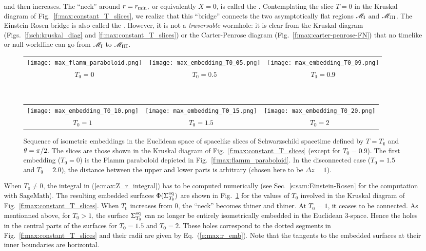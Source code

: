 and then increases. The ``neck'' around $r=r_{\rm min}$, or equivalently $X=0$, is called the
 \cite{EinstR35}.
Contemplating the slice $T=0$ in the
Kruskal diagram of Fig.~\ref{f:max:constant_T_slices}, we realize that
this ``bridge'' connects the two asymptotically flat regions $\mathscr{M}_{\rm I}$ and
$\mathscr{M}_{\rm III}$. The Einstein-Rosen bridge is also called
the . However, it is not
a \emph{traversable} wormhole: it is clear from the Kruskal diagram
(Figs.~\ref{f:sch:kruskal_diag} and \ref{f:max:constant_T_slices})
or the Carter-Penrose diagram (Fig.~\ref{f:max:carter-penrose-FN}) that no
timelike or null worldline can go from $\mathscr{M}_{\rm I}$ to
$\mathscr{M}_{\rm III}$.

\begin{figure}
\begin{center}
\begin{tabular}{ccc}
\texttt{[image: max\_flamm\_paraboloid.png]} &
\texttt{[image: max\_embedding\_T0\_05.png]} &
\texttt{[image: max\_embedding\_T0\_09.png]} \\
$T_0=0$ & $T_0=0.5$ & $T_0=0.9$
\end{tabular} \\
\begin{tabular}{ccc}
\texttt{[image: max\_embedding\_T0\_10.png]} &
\texttt{[image: max\_embedding\_T0\_15.png]} &
\texttt{[image: max\_embedding\_T0\_20.png]} \\
$T_0=1$ & $T_0=1.5$ & $T_0=2$
\end{tabular}
\end{center}
\caption[]{\label{f:max:embeddings} \footnotesize
Sequence of isometric embeddings in the Euclidean space
of spacelike slices of Schwarzschild spacetime defined by
$T=T_0$ and $\theta=\pi/2$. The slices are those shown in the Kruskal diagram
of Fig.~\ref{f:max:constant_T_slices} (except for $T_0=0.9$).
The first embedding ($T_0=0$) is the
Flamm paraboloid depicted in Fig.~\ref{f:max:flamm_paraboloid}.
In the disconnected case ($T_0=1.5$ and $T_0=2.0$),
the distance
between the upper and lower parts is arbitrary (chosen here to be $\Delta z = 1$).}
\end{figure}

When $T_0\not=0$, the integral in (\ref{e:max:Z_r_integral}) has to
be computed numerically (see Sec.~\ref{s:sam:Einstein-Rosen} for the computation with SageMath).
The resulting embedded surfaces $\Phi(\Sigma_{T_0}^{\rm eq})$ are shown in
Fig.~\ref{f:max:embeddings} for the values of $T_0$ involved in the
Kruskal diagram of Fig.~\ref{f:max:constant_T_slices}.
When $T_0$ increases from $0$, the ``neck'' becomes thiner and thiner.
At $T_0=1$, it ceases to be connected. As mentionned above, for $T_0 > 1$,
the surface $\Sigma_{T_0}^{\rm eq}$ can no longer be entirely
isometrically embedded in the Euclidean 3-space. Hence the holes in the central
parts of the surfaces for $T_0=1.5$ and $T_0=2$. These holes correspond
to the dotted segments in Fig.~\ref{f:max:constant_T_slices} and their radii
are given by Eq.~(\ref{e:max:r_emb}). Note that the tangents to the
embedded surfaces at their inner boundaries are horizontal.

